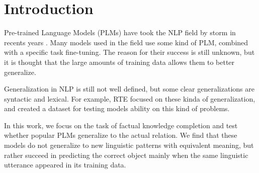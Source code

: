 \section{Introduction}



Pre-trained Language Models (PLMs) have took the NLP field by storm in recents years \cite{elmo,bert,roberta}. Many models used in the field use some kind of PLM, combined with a specific task fine-tuning.
The reason for their success is still unknown, but it is thought that the large amounts of training data allows them to better generalize.

Generalization in NLP is still not well defined, but some clear generalizations are syntactic and lexical. For example, RTE \cite{rte} focused on these kinda of generalization, and created a dataset for testing models ability on this kind of problems.

In this work, we focus on the task of factual knowledge completion  and test whether popular PLMs generalize to the actual relation. We find that these models do not generalize to new linguistic patterns with equivalent meaning, but rather succeed in predicting the correct object mainly when the same linguistic utterance appeared in its training data.

